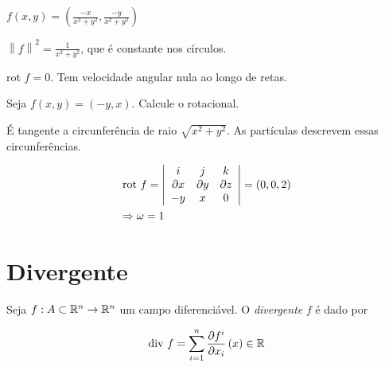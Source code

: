 \documentclass{book}
\begin{document}
\newpage 

\begin{ex}
$\displaystyle f\left( {x,y} \right) = \left( {\frac{{ - x}}{{x^2  + y^2 }},\frac{{ - y}}{{x^2  + y^2 }}} \right)$
\end{ex}

\begin{sol}
$\left\| f \right\|^2  = \displaystyle \frac{1}{{x^2  + y^2 }}$, que \'e constante nos c\'irculos.

rot $f = 0$. Tem velocidade angular nula ao longo de retas.
\end{sol}

\begin{ex}
Seja $f\left( {x,y} \right) = \left( { - y,x} \right)$. Calcule o rotacional.
\end{ex}

\begin{sol}
\'E tangente a circunfer\^encia de raio $\sqrt {x^2  + y^2 }$. As part\'iculas descrevem essas circunfer\^encias.


\[
\begin{gathered}
  {\text{rot }}f = \left| {\begin{array}{*{20}c}
   i & j & k  \\
   {\partial x} & {\partial y} & {\partial z}  \\
   { - y} & x & 0  \\

 \end{array} } \right| = \left( {0,0,2} \right) \hfill \\
   \Rightarrow \omega  = 1 \hfill \\
\end{gathered}
\]

\end{sol}

\section{Divergente} \label{sec26}

\begin{defn}
Seja $f:A \subset \mathbb{R}^n  \to \mathbb{R}^n$ um campo diferenci\'avel. O \textit{divergente} $f$ \'e dado por

\[
{\text{div }}f = \sum\limits_{i = 1}^n {\frac{{\partial f^i }}
{{\partial x_i }}\left( x \right)}  \in \mathbb{R}
\]

\end{defn}
\end{document}
